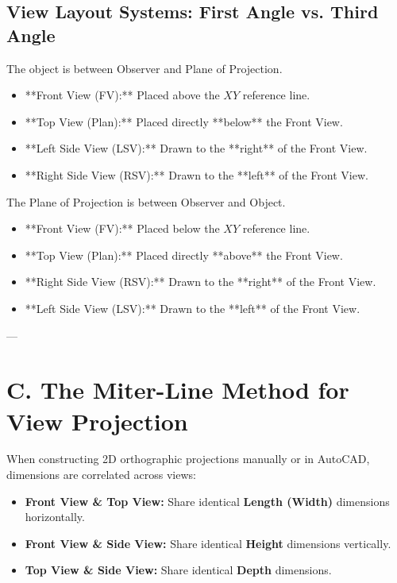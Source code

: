 \subsection{View Layout Systems: First Angle vs. Third Angle}

\begin{importantrule}
The object is between Observer and Plane of Projection.
\begin{itemize}
    \item **Front View (FV):** Placed above the $XY$ reference line.
    \item **Top View (Plan):** Placed directly **below** the Front View.
    \item **Left Side View (LSV):** Drawn to the **right** of the Front View.
    \item **Right Side View (RSV):** Drawn to the **left** of the Front View.
\end{itemize}
\end{importantrule}

\begin{importantrule}
The Plane of Projection is between Observer and Object.
\begin{itemize}
    \item **Front View (FV):** Placed below the $XY$ reference line.
    \item **Top View (Plan):** Placed directly **above** the Front View.
    \item **Right Side View (RSV):** Drawn to the **right** of the Front View.
    \item **Left Side View (LSV):** Drawn to the **left** of the Front View.
\end{itemize}
\end{importantrule}

---

\section{C. The Miter-Line Method for View Projection}

When constructing 2D orthographic projections manually or in AutoCAD, dimensions are correlated across views:
\begin{itemize}
    \item \textbf{Front View \& Top View:} Share identical \textbf{Length (Width)} dimensions horizontally.
    \item \textbf{Front View \& Side View:} Share identical \textbf{Height} dimensions vertically.
    \item \textbf{Top View \& Side View:} Share identical \textbf{Depth} dimensions.
\end{itemize}

